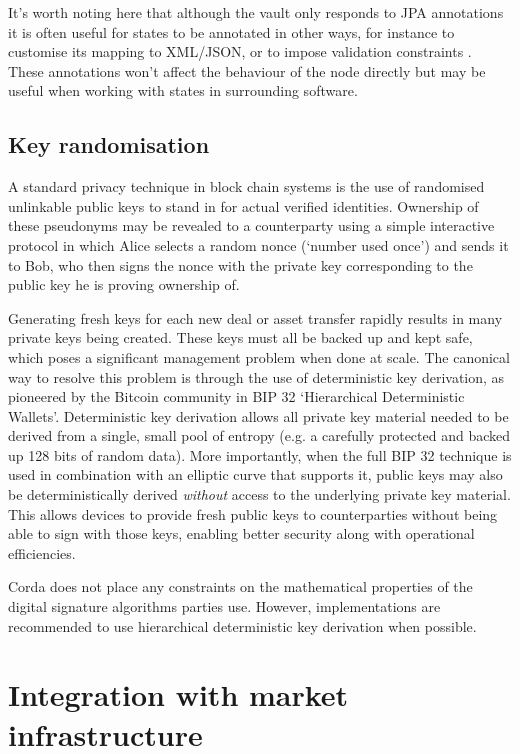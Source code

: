 \documentclass{article}
\begin{document}
It's worth noting here that although the vault only responds to JPA annotations it is often useful for states to be
annotated in other ways, for instance to customise its mapping to XML/JSON, or to impose validation constraints
\cite{BeanValidation}. These annotations won't affect the behaviour of the node directly but may be useful when working
with states in surrounding software.

\subsection{Key randomisation}\label{sec:key-randomisation}

A standard privacy technique in block chain systems is the use of randomised unlinkable public keys to stand in for
actual verified identities. Ownership of these pseudonyms may be revealed to a counterparty using a simple interactive
protocol in which Alice selects a random nonce (`number used once') and sends it to Bob, who then signs the nonce with
the private key corresponding to the public key he is proving ownership of.

Generating fresh keys for each new deal or asset transfer rapidly results in many private keys being created. These
keys must all be backed up and kept safe, which poses a significant management problem when done at scale. The canonical
way to resolve this problem is through the use of deterministic key derivation, as pioneered by the Bitcoin community in
BIP 32 `Hierarchical Deterministic Wallets'\cite{BIP32}. Deterministic key derivation allows all private key
material needed to be derived from a single, small pool of entropy (e.g. a carefully protected and backed up 128 bits of
random data). More importantly, when the full BIP 32 technique is used in combination with an elliptic curve that supports
it, public keys may also be deterministically derived \emph{without} access to the underlying private key material. This
allows devices to provide fresh public keys to counterparties without being able to sign with those keys, enabling
better security along with operational efficiencies.

Corda does not place any constraints on the mathematical properties of the digital signature algorithms parties use.
However, implementations are recommended to use hierarchical deterministic key derivation when possible.

\section{Integration with market infrastructure}
\end{document}

